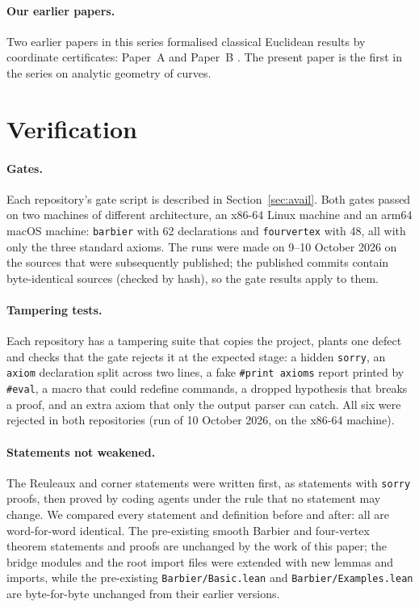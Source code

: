 \documentclass[11pt]{article}
\theoremstyle{definition}
\theoremstyle{remark}
\newcommand{\lean}[1]{\texttt{#1}}
\begin{document}
\paragraph{Our earlier papers.} Two earlier papers in this series formalised classical Euclidean
results by coordinate certificates: Paper~A \cite{paperA} and Paper~B \cite{paperB}. The present paper is the first in the series on
analytic geometry of curves.

\section{Verification}\label{sec:verify}

\paragraph{Gates.} Each repository's gate script is described in Section~\ref{sec:avail}. Both gates passed on two machines of different
architecture, an x86-64 Linux machine and an arm64 macOS machine: \lean{barbier} with 62 declarations
and \lean{fourvertex} with 48, all with only the three standard axioms. The runs were made on
9--10 October 2026 on the sources that were subsequently published; the published commits contain
byte-identical sources (checked by hash), so the gate results apply to them.

\paragraph{Tampering tests.} Each repository has a tampering suite that copies the project, plants one
defect and checks that the gate rejects it at the expected stage: a hidden \lean{sorry}, an
\lean{axiom} declaration split across two lines, a fake \lean{\#print axioms} report printed by
\lean{\#eval}, a macro that could redefine commands, a dropped hypothesis that breaks a proof, and an
extra axiom that only the output parser can catch. All six were rejected in both repositories (run of 10 October 2026, on the x86-64 machine).

\paragraph{Statements not weakened.} The Reuleaux and corner statements were written first, as
statements with \lean{sorry} proofs, then proved by coding agents under the rule that no statement
may change. We compared every statement and definition before and after: all are word-for-word
identical. The pre-existing smooth Barbier and four-vertex theorem statements and proofs are
unchanged by the work of this paper; the bridge modules and the root import files were extended with
new lemmas and imports, while the pre-existing \lean{Barbier/Basic.lean} and \lean{Barbier/Examples.lean}
are byte-for-byte unchanged from their earlier versions.
\end{document}

